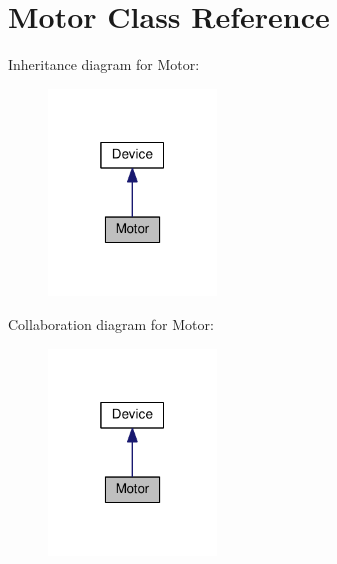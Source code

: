 \hypertarget{class_motor}{}\section{Motor Class Reference}
\label{class_motor}


Inheritance diagram for Motor\+:\nopagebreak
\begin{figure}[H]
\begin{center}
\leavevmode
\includegraphics[width=127pt]{class_motor__inherit__graph}
\end{center}
\end{figure}


Collaboration diagram for Motor\+:\nopagebreak
\begin{figure}[H]
\begin{center}
\leavevmode
\includegraphics[width=127pt]{class_motor__coll__graph}
\end{center}
\end{figure}
